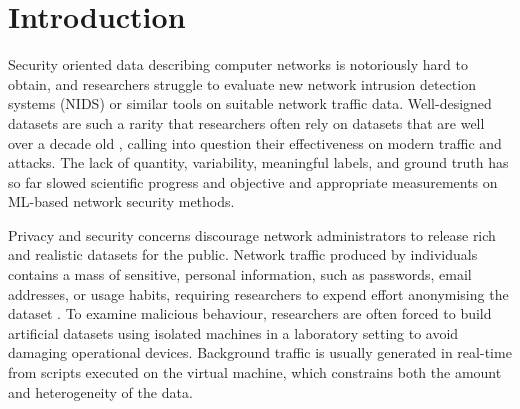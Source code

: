 





\section{Introduction}


Security oriented data describing computer networks is notoriously hard to obtain, and researchers struggle to evaluate new network intrusion detection systems (NIDS) or similar tools on suitable network traffic data.
Well-designed datasets are such a rarity that researchers often rely on datasets that are well over a decade old \cite{tavallaee2009detailed, kayacik2005selecting}, calling into question their effectiveness on modern traffic and attacks. The lack of quantity, variability, meaningful labels, and ground truth has so far slowed scientific progress and objective and appropriate measurements on ML-based network security methods.


Privacy and security concerns discourage network administrators to release rich and realistic datasets for the public. Network traffic produced by individuals contains a mass of sensitive, personal information, such as passwords, email addresses, or usage habits, requiring researchers to expend effort anonymising the dataset \cite{mirsky2016sherlock}. To examine malicious behaviour, researchers are often forced to build artificial datasets using isolated machines in a laboratory setting to avoid damaging operational devices. Background traffic is usually generated in real-time from scripts executed on the virtual machine, which constrains both the amount and heterogeneity of the data. %

